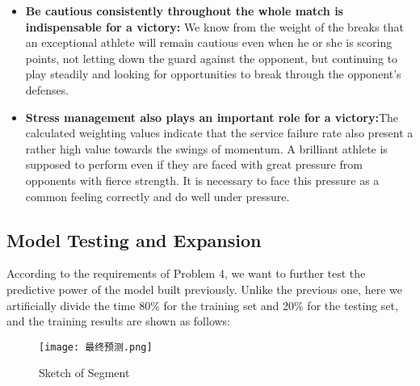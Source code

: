 \documentclass{mcmthesis}
\begin{document}
\begin{itemize}
    \item {\bf Be cautious consistently throughout the whole match is indispensable for a victory:}
    We
    know from the weight of the breaks that an exceptional athlete will remain cautious even when he
    or she is scoring points, not letting down the guard against the opponent, but continuing to play
    steadily and looking for opportunities to break through the opponent's defenses.\\
    \item {\bf Stress management also plays an important role for a victory:}The calculated weighting
    values indicate that the service failure rate also present a rather high value towards the swings of
    momentum. A brilliant athlete is supposed to perform even if they are faced with great pressure
    from opponents with fierce strength. It is necessary to face this pressure as a common feeling
    correctly and do well under pressure.
\end{itemize}

\subsection{Model Testing and Expansion}
According to the requirements of Problem 4, we want to further test the predictive power of
the model built previously. Unlike the previous one, here we artificially divide the time 80\% for
the training set and 20\% for the testing set, and the training results are shown as follows:

\begin{figure}[htbp]
    \centering
    \texttt{[image: 最终预测.png]}
    \caption{Sketch of Segment} \label{Figure 24}
\end{figure}
\end{document}
